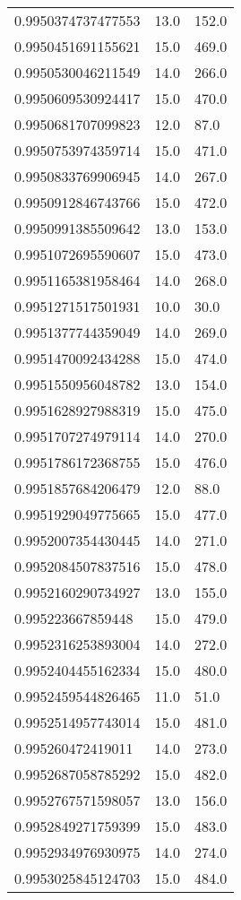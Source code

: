 \begin{center}
\begin{supertabular}[H]{p{0.30\textwidth}p{0.05\textwidth}p{0.05\textwidth}}
0.9950374737477553 & 13.0 & 152.0 \\ 
0.9950451691155621 & 15.0 & 469.0 \\ 
0.9950530046211549 & 14.0 & 266.0 \\ 
0.9950609530924417 & 15.0 & 470.0 \\ 
0.9950681707099823 & 12.0 & 87.0 \\ 
0.9950753974359714 & 15.0 & 471.0 \\ 
0.9950833769906945 & 14.0 & 267.0 \\ 
0.9950912846743766 & 15.0 & 472.0 \\ 
0.9950991385509642 & 13.0 & 153.0 \\ 
0.9951072695590607 & 15.0 & 473.0 \\ 
0.9951165381958464 & 14.0 & 268.0 \\ 
0.9951271517501931 & 10.0 & 30.0 \\ 
0.9951377744359049 & 14.0 & 269.0 \\ 
0.9951470092434288 & 15.0 & 474.0 \\ 
0.9951550956048782 & 13.0 & 154.0 \\ 
0.9951628927988319 & 15.0 & 475.0 \\ 
0.9951707274979114 & 14.0 & 270.0 \\ 
0.9951786172368755 & 15.0 & 476.0 \\ 
0.9951857684206479 & 12.0 & 88.0 \\ 
0.9951929049775665 & 15.0 & 477.0 \\ 
0.9952007354430445 & 14.0 & 271.0 \\ 
0.9952084507837516 & 15.0 & 478.0 \\ 
0.9952160290734927 & 13.0 & 155.0 \\ 
0.995223667859448 & 15.0 & 479.0 \\ 
0.9952316253893004 & 14.0 & 272.0 \\ 
0.9952404455162334 & 15.0 & 480.0 \\ 
0.9952459544826465 & 11.0 & 51.0 \\ 
0.9952514957743014 & 15.0 & 481.0 \\ 
0.995260472419011 & 14.0 & 273.0 \\ 
0.9952687058785292 & 15.0 & 482.0 \\ 
0.9952767571598057 & 13.0 & 156.0 \\ 
0.9952849271759399 & 15.0 & 483.0 \\ 
0.9952934976930975 & 14.0 & 274.0 \\ 
0.9953025845124703 & 15.0 & 484.0 \\ 

\end{supertabular}
\end{center}
